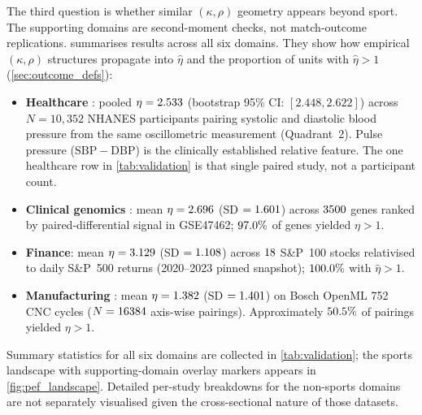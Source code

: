 The third question is whether similar $(\kappa,\rho)$ geometry appears beyond sport. The supporting domains are second-moment checks, not match-outcome replications.  summarises results across all six domains. They show how empirical $(\kappa,\rho)$ structures propagate into $\hat\eta$ and the proportion of units with $\hat\eta>1$ (\cref{sec:outcome_defs}):
\begin{itemize}
  \item \textbf{Healthcare} \parencite{nhanes2017pbxo}: pooled $\eta=2.533$ (bootstrap 95\% CI: $[2.448,2.622]$) across $N=10{,}352$ {NHANES} participants pairing systolic and diastolic blood pressure from the same oscillometric measurement (Quadrant~2). Pulse pressure ($\mathrm{SBP}-\mathrm{DBP}$) is the clinically established relative feature. The one healthcare row in \cref{tab:validation} is that single paired study, not a participant count.
  \item \textbf{Clinical genomics} \parencite{brunner2014earlybreast,geoGSE47462}: mean $\eta=2.696$ ({SD} $=1.601$) across $3500$ genes ranked by paired-differential signal in {GSE47462}; $97.0\%$ of genes yielded $\eta>1$.
  \item \textbf{Finance}: mean $\eta=3.129$ ({SD} $=1.108$) across $18$ {S\&P}~100 stocks relativised to daily {S\&P}~500 returns (2020--2023 pinned snapshot); $100.0\%$ with $\hat\eta>1$.
  \item \textbf{Manufacturing} \parencite{openml752bosch}: mean $\eta=1.382$ ({SD} $=1.401$) on {Bosch} {OpenML} 752 {CNC} cycles ($N=16384$ axis-wise pairings). Approximately $50.5\%$ of pairings yielded $\eta>1$.
\end{itemize}
Summary statistics for all six domains are collected in \cref{tab:validation}; the sports landscape with supporting-domain overlay markers appears in \cref{fig:pef_landscape}. Detailed per-study breakdowns for the non-sports domains are not separately visualised given the cross-sectional nature of those datasets.
